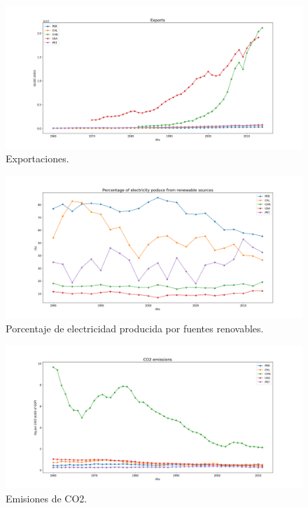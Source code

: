 \documentclass{article}
\begin{document}
\begin{figure}
	\centering
	\includegraphics[scale=0.38]{images/figure_1-5.png}
	\caption{Exportaciones.}
	\label{fig:8}
\end{figure}

\begin{figure}
	\centering
	\includegraphics[scale=0.38]{images/figure_1-7.png}
	\caption{Porcentaje de electricidad producida por fuentes renovables.}
	\label{fig:9}
\end{figure}

\begin{figure}
	\centering
	\includegraphics[scale=0.38]{images/figure_1-8.png}
	\caption{Emisiones de CO2.}
	\label{fig:10}
\end{figure}
\end{document}
